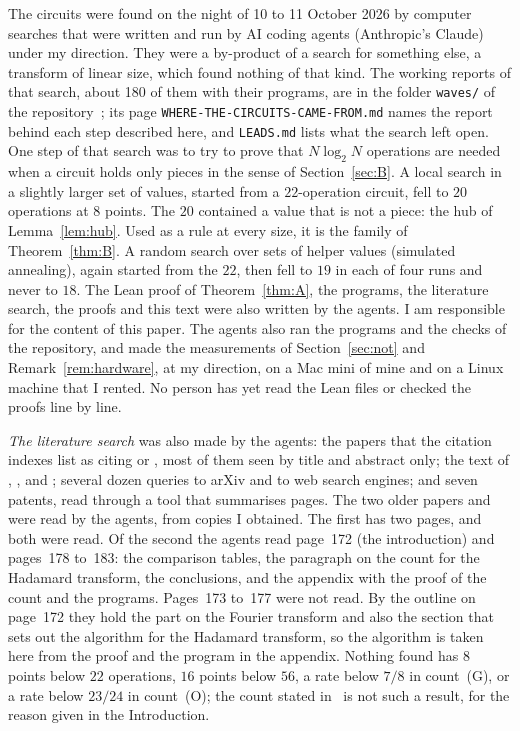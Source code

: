 \documentclass[10pt]{article}
\theoremstyle{remark}
\newcommand{\cntG}{\textup{(G)}}
\newcommand{\cntO}{\textup{(O)}}
\renewcommand{\lg}{\log_2}
\begin{document}
The circuits were found on the night of 10 to 11 October 2026 by computer searches that were written and
run by AI coding agents (Anthropic's Claude) under my direction. They were a by-product of a search for
something else, a transform of linear size, which found nothing of that kind.
The working reports of that search, about 180 of them with their programs, are in the folder
\texttt{waves/} of the repository~\cite{Repo}; its page \texttt{WHERE-THE-CIRCUITS-CAME-FROM.md} names
the report behind each step described here, and \texttt{LEADS.md} lists what the search left open.
One step of that search was
to try to prove that $N\lg N$ operations are needed when a circuit holds only pieces in the sense of
Section~\ref{sec:B}. A local search in a slightly larger set of values, started from a $22$-operation
circuit, fell to $20$ operations at $8$ points. The $20$ contained a value that is not a piece: the hub of
Lemma~\ref{lem:hub}. Used as a rule at every size, it is the family of Theorem~\ref{thm:B}. A random search
over sets of helper values (simulated annealing), again started from the $22$, then fell to $19$ in each of
four runs and never to $18$. The Lean proof of Theorem~\ref{thm:A}, the programs, the literature search,
the proofs and this text were also written by the agents. I am responsible for the
content of this paper.
The agents also ran the programs and the checks of the repository, and made the measurements of
Section~\ref{sec:not} and Remark~\ref{rem:hardware}, at my direction, on a Mac mini of mine
and on a Linux machine that I rented. No person has yet read the Lean files or checked the proofs line by line.

\emph{The literature search} was also made by the agents: the papers that the citation indexes list as citing
\cite{AR} or \cite{CFL}, most of them seen by title and abstract only; the text of \cite{AR}, \cite{Feig},
\cite{VP} and \cite{GB}; several dozen queries to arXiv and to web search engines; and seven patents, read
through a tool that summarises pages. The two older papers \cite{CFL} and \cite{GA} were read by the
agents, from copies I obtained. The first has two pages, and both were read. Of the second the agents read
page~172 (the introduction) and pages~178 to~183: the comparison tables, the paragraph on the count for the
Hadamard transform, the conclusions, and the appendix with the proof of the count and the programs.
Pages~173 to~177 were not read. By the outline on page~172 they hold the part on the Fourier transform and
also the section that sets out the algorithm for the Hadamard transform, so the algorithm is taken here from
the proof and the program in the appendix. Nothing
found has $8$ points below $22$ operations, $16$ points below $56$, a rate below $7/8$ in count~\cntG, or a rate
below $23/24$ in count~\cntO; the count stated in~\cite{GA} is not such a result, for the reason given in the
Introduction.
\end{document}
